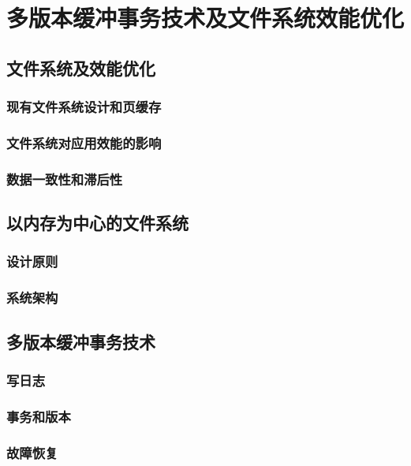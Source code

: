\chapter{多版本缓冲事务技术及文件系统效能优化}
\label{chap:vct}

\section{文件系统及效能优化}

\subsection{现有文件系统设计和页缓存}

\subsection{文件系统对应用效能的影响}

\subsection{数据一致性和滞后性}

\section{以内存为中心的文件系统}

\subsection{设计原则}

\subsection{系统架构}

\section{多版本缓冲事务技术}

\subsection{写日志}

\subsection{事务和版本}

\subsection{故障恢复}

